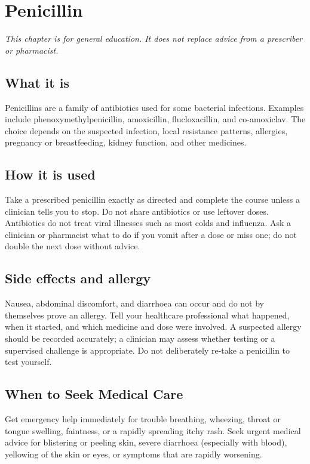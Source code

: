 \chapter{Penicillin}

\medskip
\noindent\textit{This chapter is for general education. It does not replace advice from a prescriber or pharmacist.}

\section*{What it is}
Penicillins are a family of antibiotics used for some bacterial infections. Examples include phenoxymethylpenicillin, amoxicillin, flucloxacillin, and co-amoxiclav. The choice depends on the suspected infection, local resistance patterns, allergies, pregnancy or breastfeeding, kidney function, and other medicines.

\section*{How it is used}
Take a prescribed penicillin exactly as directed and complete the course unless a clinician tells you to stop. Do not share antibiotics or use leftover doses. Antibiotics do not treat viral illnesses such as most colds and influenza. Ask a clinician or pharmacist what to do if you vomit after a dose or miss one; do not double the next dose without advice.

\section*{Side effects and allergy}
Nausea, abdominal discomfort, and diarrhoea can occur and do not by themselves prove an allergy. Tell your healthcare professional what happened, when it started, and which medicine and dose were involved. A suspected allergy should be recorded accurately; a clinician may assess whether testing or a supervised challenge is appropriate. Do not deliberately re-take a penicillin to test yourself.

\section*{When to Seek Medical Care}
Get emergency help immediately for trouble breathing, wheezing, throat or tongue swelling, faintness, or a rapidly spreading itchy rash. Seek urgent medical advice for blistering or peeling skin, severe diarrhoea (especially with blood), yellowing of the skin or eyes, or symptoms that are rapidly worsening.

